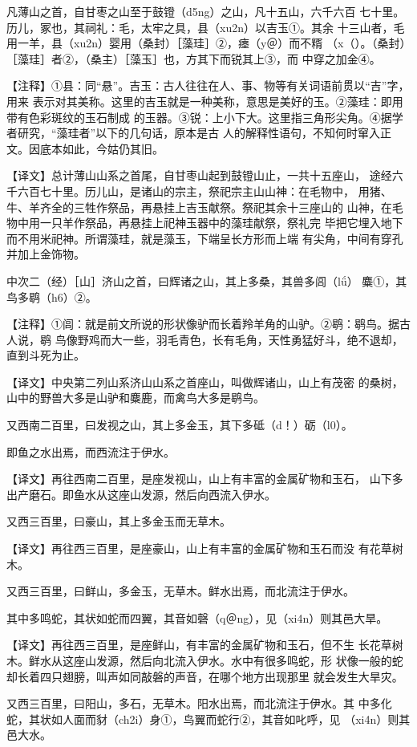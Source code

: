 \documentclass[a4paper,12pt,UTF8,twoside]{ctexbook}
\begin{document}
凡薄山之首，自甘枣之山至于鼓镫（d5ng）之山，凡十五山，六千六百 七十里。历儿，冢也，其祠礼：毛，太牢之具，县（xu2n）以吉玉①。其余 十三山者，毛用一羊，县（xu2n）婴用（桑封）［藻珪］②，瘗（y＠）而不糈 （x（）。（桑封）［藻珪］者②，（桑主）［藻玉］也，方其下而锐其上③，而 中穿之加金④。

【注释】①县：同“悬”。吉玉：古人往往在人、事、物等有关词语前贯以“吉”字，用来 表示对其美称。这里的吉玉就是一种美称，意思是美好的玉。②藻珪：即用带有色彩斑纹的玉石制成 的玉器。③锐：上小下大。这里指三角形尖角。④据学者研究，“藻珪者”以下的几句话，原本是古 人的解释性语句，不知何时窜入正文。因底本如此，今姑仍其旧。

【译文】总计薄山山系之首尾，自甘枣山起到鼓镫山止，一共十五座山， 途经六千六百七十里。历儿山，是诸山的宗主，祭祀宗主山山神：在毛物中， 用猪、牛、羊齐全的三牲作祭品，再悬挂上吉玉献祭。祭祀其余十三座山的 山神，在毛物中用一只羊作祭品，再悬挂上祀神玉器中的藻珪献祭，祭礼完 毕把它埋入地下而不用米祀神。所谓藻珪，就是藻玉，下端呈长方形而上端 有尖角，中间有穿孔并加上金饰物。

中次二（经）［山］济山之首，曰辉诸之山，其上多桑，其兽多闾（lǘ） 麋①，其鸟多鹖（h6）②。

【注释】①闾：就是前文所说的形状像驴而长着羚羊角的山驴。②鹖：鹖鸟。据古人说，鹖 鸟像野鸡而大一些，羽毛青色，长有毛角，天性勇猛好斗，绝不退却，直到斗死为止。

【译文】中央第二列山系济山山系之首座山，叫做辉诸山，山上有茂密 的桑树，山中的野兽大多是山驴和麋鹿，而禽鸟大多是鹖鸟。

又西南二百里，曰发视之山，其上多金玉，其下多砥（d！）砺（l0）。

即鱼之水出焉，而西流注于伊水。

【译文】再往西南二百里，是座发视山，山上有丰富的金属矿物和玉石， 山下多出产磨石。即鱼水从这座山发源，然后向西流入伊水。

又西三百里，曰豪山，其上多金玉而无草木。

【译文】再往西三百里，是座豪山，山上有丰富的金属矿物和玉石而没 有花草树木。

又西三百里，曰鲜山，多金玉，无草木。鲜水出焉，而北流注于伊水。

其中多鸣蛇，其状如蛇而四翼，其音如磬（q＠ng），见（xi4n）则其邑大旱。

【译文】再往西三百里，是座鲜山，有丰富的金属矿物和玉石，但不生 长花草树木。鲜水从这座山发源，然后向北流入伊水。水中有很多鸣蛇，形 状像一般的蛇却长着四只翅膀，叫声如同敲磐的声音，在哪个地方出现那里 就会发生大旱灾。

又西三百里，曰阳山，多石，无草木。阳水出焉，而北流注于伊水。其 中多化蛇，其状如人面而豺（ch2i）身①，鸟翼而蛇行②，其音如叱呼，见 （xi4n）则其邑大水。
\end{document}
